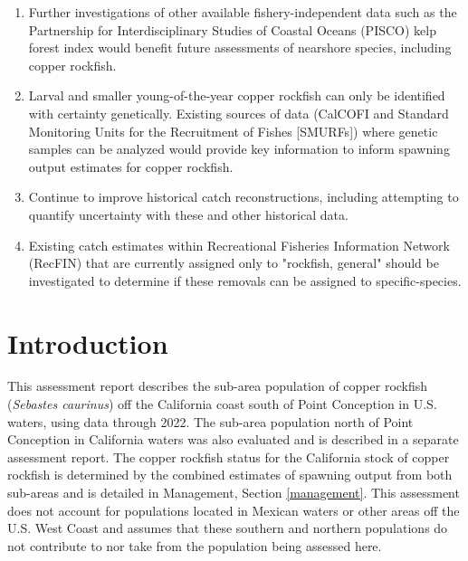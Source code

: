 \documentclass[11pt,
  english,
  letterpaper,
]{article}
\begin{document}
\begin{enumerate}
 \item Further investigations of other available fishery-independent data such as the Partnership for Interdisciplinary Studies of Coastal Oceans (PISCO) kelp forest index would benefit future assessments of nearshore species, including copper rockfish. 

 \item Larval and smaller young-of-the-year copper rockfish can only be identified with certainty genetically. Existing sources of data (CalCOFI and Standard Monitoring Units for the Recruitment of Fishes [SMURFs]) where genetic samples can be analyzed would provide key information to inform spawning output estimates for copper rockfish.
 
  \item Continue to improve historical catch reconstructions, including attempting to quantify uncertainty with these and other historical data.
  
  \item Existing catch estimates within Recreational Fisheries Information Network (RecFIN) that are currently assigned only to "rockfish, general" should be investigated to determine if these removals can be assigned to specific-species.



\end{enumerate}

\pagebreak
\setlength{\parskip}{5mm plus1mm minus1mm}
\setcounter{page}{1}
\renewcommand{\thefigure}{\arabic{figure}}
\renewcommand{\thetable}{\arabic{table}}
\setcounter{table}{0}
\setcounter{figure}{0}

\hypertarget{introduction}{%
\section{Introduction}\label{introduction}}

This assessment report describes the sub-area population of copper rockfish (\emph{Sebastes caurinus}) off the California coast south of Point Conception in U.S. waters, using data through 2022. The sub-area population north of Point Conception in California waters was also evaluated and is described in a separate assessment report. The copper rockfish status for the California stock of copper rockfish is determined by the combined estimates of spawning output from both sub-areas and is detailed in Management, Section \ref{management}. This assessment does not account for populations located in Mexican waters or other areas off the U.S. West Coast and assumes that these southern and northern populations do not contribute to nor take from the population being assessed here.
\end{document}
